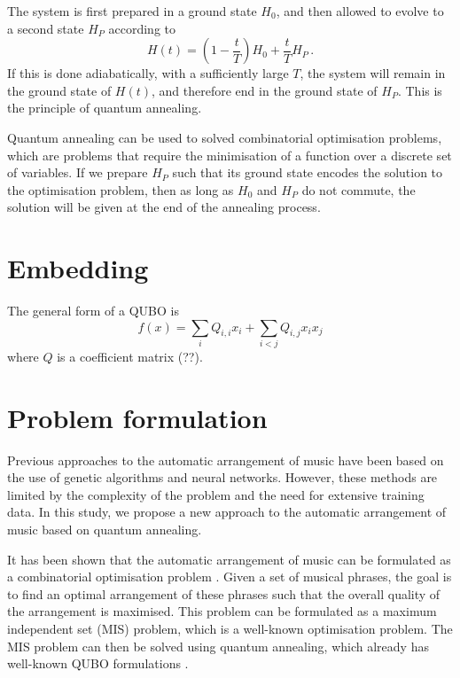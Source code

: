 \documentclass[aps,pra,10pt,twocolumn]{revtex4-2}
\begin{document}
The system is first prepared in a ground state $H_0$, and then allowed to evolve to a second state $H_P$ according to
\begin{equation}
    H(t)=\left(1- \frac{t}{T}\right)H_0 + \frac{t}{T}H_P \,.
    \label{eq:time-evolution}
\end{equation}
If this is done adiabatically, with a sufficiently large $T$, the system will remain in the ground state of $H(t)$, and therefore end in the ground state of $H_P$. This is the principle of quantum annealing.

Quantum annealing can be used to solved combinatorial optimisation problems, which are problems that require the minimisation of a function over a discrete set of variables. If we prepare $H_P$ such that its ground state encodes the solution to the optimisation problem, then as long as $H_0$ and $H_P$ do not commute, the solution will be given at the end of the annealing process.



\section{Embedding}

The general form of a QUBO is
\begin{equation}
    f(x)=\sum_iQ_{i,i}x_i+\sum_{i<j}Q_{i,j}x_ix_j
    \label{eq:QUBO}
\end{equation}
where $Q$ is a coefficient matrix (??).

\section{Problem formulation}

Previous approaches to the automatic arrangement of music have been based on the use of genetic algorithms and neural networks. However, these methods are limited by the complexity of the problem and the need for extensive training data. In this study, we propose a new approach to the automatic arrangement of music based on quantum annealing.

It has been shown that the automatic arrangement of music can be formulated as a combinatorial optimisation problem \cite{moses_computational_2016}. Given a set of musical phrases, the goal is to find an optimal arrangement of these phrases such that the overall quality of the arrangement is maximised. This problem can be formulated as a maximum independent set (MIS) problem, which is a well-known optimisation problem. The MIS problem can then be solved using quantum annealing, which already has well-known QUBO formulations \cite{lucas_ising_2014}.
\end{document}
